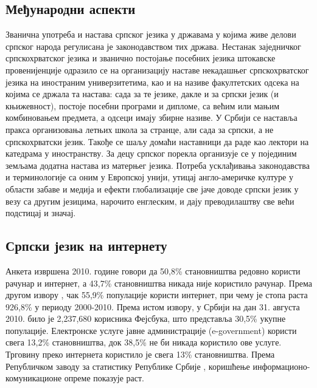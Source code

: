 \begin{multicols}{2}
 \subsection {Међународни аспекти}
   
 
Званична употреба и настава српског језика у државама у којима живе делови српског народа регулисана је законодавством тих држава. 
Нестанак заједничког српскохрватског језика и званично постојање посебних језика штокавске провенијенције одразило се на организацију наставе некадашњег српскохрватског језика на иностраним универзитетима, као и на називе факултетских одсека на којима се држала та настава: сада за те језике, дакле и за српски језик (и књижевност), постоје посебни програми и дипломе, са већим или мањим комбиновањем предмета, а одсеци имају збирне називе.
У Србији се наставља пракса организовања летњих  школа за странце, али сада за српски, а не српскохрватски језик. Такође се шаљу домаћи наставници да раде као лектори на катедрама у иностранству. 
За децу српског порекла организује се у појединим земљама додатна настава из матерњег језика. 
Потреба усклађивања законодавства и терминологије са оним у Европској унији, утицај англо-америчке културе у области забаве и медија и ефекти глобализације све јаче доводе српски језик у везу са другим језицима, нарочито енглеским, и дају преводилаштву све већи  подстицај и значај.

 \subsection {Српски језик на интернету}
   
Анкета \cite{PKEY204} извршена 2010. године говори да 50,8\% становништва редовно користи рачунар и интернет, а 43,7\% становништва никада није користило рачунар. Према другом извору \cite{EUROPA2}, чак 55,9\% популације користи интернет, при чему је стопа раста 926,8\% у периоду 2000-2010. Према истом извору, у Србији на дан 31. августа 2010. било је 2,237,680 корисника Фејсбука, што представља 30,5\% укупне популације. Електронске услуге јавне администрације (e-government) користи  свега 13,2\% становништва, док 38,5\% не би никада користило ове услуге. Трговину преко интернета користило је свега 13\% становништва. Према Републичком заводу за статистику Републике Србије \cite{WEBRZS}, коришћење информационо-комуникационе опреме показује раст.


\end{multicols}
